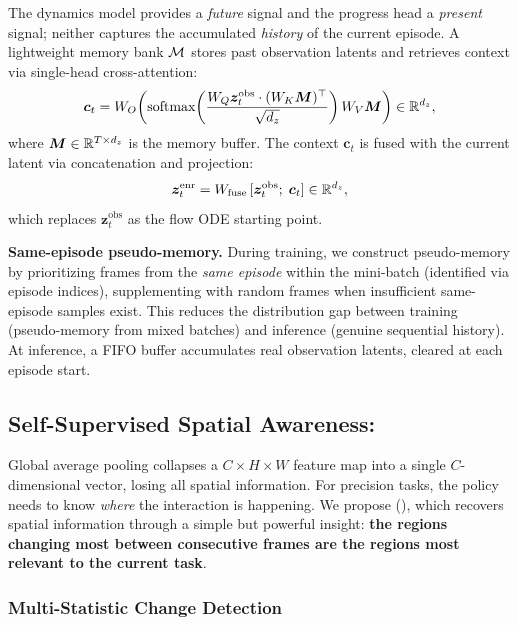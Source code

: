 The dynamics model provides a \emph{future} signal and the progress head a \emph{present} signal; neither captures the accumulated \emph{history} of the current episode. A lightweight memory bank $\mathcal{M}$ stores past observation latents and retrieves context via single-head cross-attention:
\begin{equation}
    \bm{c}_t = W_O\!\left(\text{softmax}\!\left(\frac{W_Q \bm{z}_t^{\text{obs}} \cdot (W_K \bm{M})^\top}{\sqrt{d_z}}\right) W_V \bm{M}\right) \in \mathbb{R}^{d_z},
    \label{eq:mem_read}
\end{equation}
where $\bm{M} \in \mathbb{R}^{T \times d_z}$ is the memory buffer. The context $\bm{c}_t$ is fused with the current latent via concatenation and projection:
\begin{equation}
    \bm{z}_t^{\text{enr}} = W_{\text{fuse}}\,[\bm{z}_t^{\text{obs}};\; \bm{c}_t] \in \mathbb{R}^{d_z},
    \label{eq:enriched_latent}
\end{equation}
which replaces $\bm{z}_t^{\text{obs}}$ as the flow ODE starting point.

\textbf{Same-episode pseudo-memory.} During training, we construct pseudo-memory by prioritizing frames from the \emph{same episode} within the mini-batch (identified via episode indices), supplementing with random frames when insufficient same-episode samples exist. This reduces the distribution gap between training (pseudo-memory from mixed batches) and inference (genuine sequential history). At inference, a FIFO buffer accumulates real observation latents, cleared at each episode start.

\subsection{Self-Supervised Spatial Awareness: \fasa{}}
\label{sec:spatial}

Global average pooling collapses a $C \times H \times W$ feature map into a single $C$-dimensional vector, losing all spatial information. For precision tasks, the policy needs to know \emph{where} the interaction is happening. We propose \fasa{} (\fasafull{}), which recovers spatial information through a simple but powerful insight: \textbf{the regions changing most between consecutive frames are the regions most relevant to the current task}.

\subsubsection{Multi-Statistic Change Detection}
\label{sec:fasa_change}

